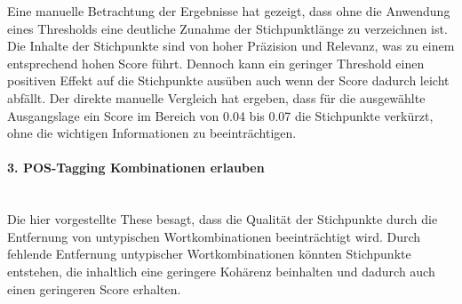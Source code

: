 Eine manuelle Betrachtung der Ergebnisse hat gezeigt, dass ohne die Anwendung eines Thresholds eine deutliche Zunahme der Stichpunktlänge zu verzeichnen ist. Die Inhalte der Stichpunkte sind von hoher Präzision und Relevanz, was zu einem entsprechend hohen Score führt. Dennoch kann ein geringer Threshold einen positiven Effekt auf die Stichpunkte ausüben auch wenn der Score dadurch leicht abfällt. Der direkte manuelle Vergleich hat ergeben, dass für die ausgewählte Ausgangslage ein Score im Bereich von 0.04 bis 0.07 die Stichpunkte verkürzt, ohne die wichtigen Informationen zu beeinträchtigen.
\paragraph{3. POS-Tagging Kombinationen erlauben}\mbox{}\\
Die hier vorgestellte These besagt, dass die Qualität der Stichpunkte durch die Entfernung von untypischen Wortkombinationen beeinträchtigt wird. Durch fehlende Entfernung untypischer Wortkombinationen könnten Stichpunkte entstehen, die inhaltlich eine geringere Kohärenz beinhalten und dadurch auch einen geringeren Score erhalten.\\

